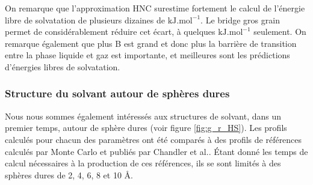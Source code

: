 On remarque que l'approximation HNC surestime fortement le calcul de l'énergie libre de solvatation de plusieurs dizaines de $\mathrm{kJ.mol}^{-1}$. Le bridge gros grain permet de considérablement réduire cet écart, à quelques $\mathrm{kJ.mol}^{-1}$ seulement.
On remarque également que plus B est grand et donc plus la barrière de transition entre la phase liquide et gaz est importante, et meilleures sont les prédictions d'énergies libres de solvatation. 




\subsubsection{ Structure du solvant autour de sphères dures }
Nous nous sommes également intéressés aux structures de solvant, dans un premier temps, autour de sphère dures (voir figure \ref{fig:g_r_HS}). Les profils calculés pour chacun des paramètres ont été comparés à des profils de références calculés par Monte Carlo et publiés par Chandler et al.\cite{huang_hydrophobic_2002}. \'Etant donné les temps de calcul nécessaires à la production de ces références, ils se sont limités à des sphères dures de 2, 4, 6, 8 et 10 \AA.




